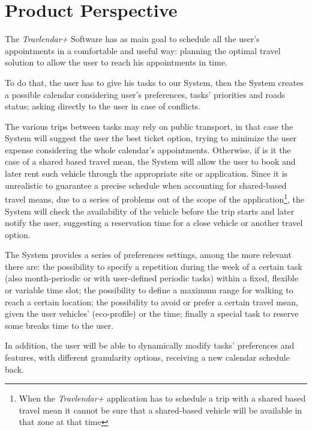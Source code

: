 \section{Product Perspective}
The \emph{Travlendar+} Software has as main goal to schedule all the user's appointments in a comfortable and useful way: planning the optimal travel solution to allow the user to reach his appointments in time.

To do that, the user has to give his tasks to our System, then the System creates a possible calendar considering user's preferences, tasks' priorities and roads status; asking directly to the user in case of conflicts.

The various trips between tasks may rely on public transport, in that case the System will suggest the user the best ticket option, trying to minimize the user expense considering the whole calendar's appointments. Otherwise, if is it the case of a shared based travel mean, the System will allow the user to book and later rent such vehicle through the appropriate site or application.
Since it is unrealistic to guarantee a precise schedule when accounting for shared-based travel means, due to a series of problems out of the scope of the application\footnote{When the \emph{Travlendar+} application has to schedule a trip with a shared based travel mean it cannot be sure that a shared-based vehicle will be available in that zone at that time}, the System will check the availability of the vehicle before the trip starts and later notify the user, suggesting a reservation time for a close vehicle or another travel option.    

The System provides a series of preferences settings, among the more relevant there are: the possibility to specify a repetition during the week of a certain task (also month-periodic or with user-defined periodic tasks) within a fixed, flexible or variable time slot; the possibility to define a maximum range for walking to reach a certain location; the possibility to avoid or prefer a certain travel mean, given the user vehicles' (eco-profile) or the time; finally a special task to reserve some breaks time to the user.

In addition, the user will be able to dynamically modify tasks' preferences and features, with different granularity options, receiving a new calendar schedule back.

